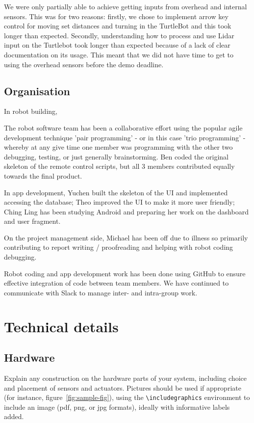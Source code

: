 \documentclass{article}
\begin{document}
We were only partially able to achieve getting inputs from overhead and internal sensors. This was for two reasons: firstly, we chose to implement arrow key control for moving set distances and turning in the TurtleBot and this took longer than expected. Secondly, understanding how to process and use Lidar input on the Turtlebot took longer than expected because of a lack of clear documentation on its usage. This meant that we did not have time to get to using the overhead sensors before the demo deadline.

\subsection{Organisation}

In robot building,

The robot software team has been a collaborative effort using the popular agile development technique 'pair programming' - or in this case 'trio programming' - whereby at any give time one member was programming with the other two debugging, testing, or just generally brainstorming. Ben coded the original skeleton of the remote control scripts, but all 3 members contributed equally towards the final product.

In app development, Yuchen built the skeleton of the UI and implemented accessing the database; Theo improved the UI to make it more user friendly; Ching Ling has been studying Android and preparing her work on the dashboard and user fragment.

On the project management side, Michael has been off due to illness so primarily contributing to report writing / proofreading and helping with robot coding debugging. 

Robot coding and app development work has been done using GitHub to ensure effective integration of code between team members. We have continued to communicate with Slack to manage inter- and intra-group work.

\section{Technical details}


\subsection{Hardware}

Explain any construction on the hardware parts of your system, including choice and placement of sensors and actuators. Pictures should be used if appropriate (for instance, figure~\ref{fig:sample-fig}), using the \verb+\includegraphics+ environment to include an image (pdf, png, or jpg formats), ideally with informative labels added. 
\end{document}
